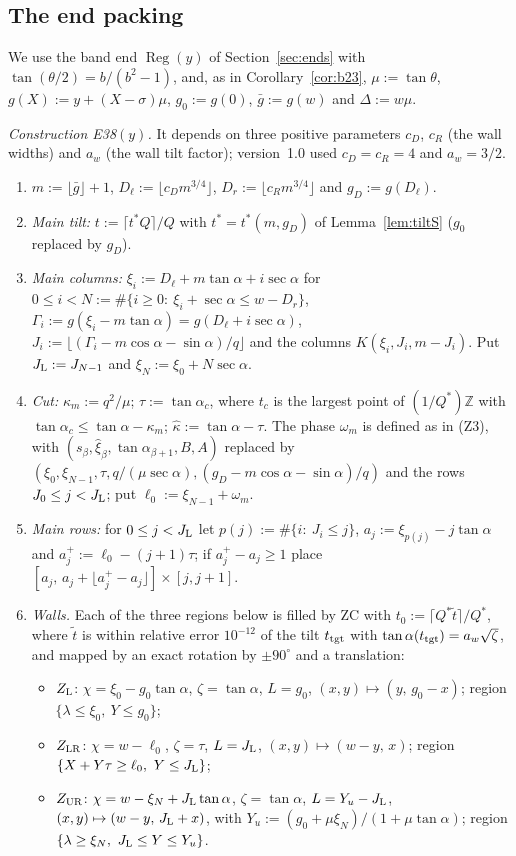 \documentclass[11pt]{amsart}
\newcommand{\Z}{\mathbb Z}
\newcommand{\Reg}{\operatorname{Reg}}
\newcommand{\ca}{\cos\alpha}
\newcommand{\sa}{\sin\alpha}
\newcommand{\ta}{\tan\alpha}
\newcommand{\se}{\sec\alpha}
\theoremstyle{definition}
\theoremstyle{remark}
\numberwithin{equation}{section}
\begin{document}
\subsection{The end packing}\label{ssec:E38}
We use the band end $\Reg(y)$ of Section~\ref{sec:ends} with $\tan(\theta/2)=b/(b^2-1)$, and, as in
Corollary~\ref{cor:b23}, $\mu:=\tan\theta$, $g(X):=y+(X-\sigma)\mu$, $g_0:=g(0)$, $\bar g:=g(w)$ and $\Delta:=w\mu$.

\emph{Construction E38$(y)$.} It depends on three positive parameters $c_D$, $c_R$ (the wall widths) and $a_w$ (the wall
tilt factor); version~1.0 used $c_D=c_R=4$ and $a_w=3/2$.
\begin{enumerate}[label=(E\arabic*)]
\item $m:=\lfloor\bar g\rfloor+1$, $D_\ell:=\lfloor c_Dm^{3/4}\rfloor$, $D_r:=\lfloor c_Rm^{3/4}\rfloor$ and $g_D:=g(D_\ell)$.
\item \emph{Main tilt:} $t:=\lceil t^*Q\rceil/Q$ with $t^*=t^*(m,g_D)$ of Lemma~\ref{lem:tiltS} ($g_0$ replaced by
$g_D$).
\item \emph{Main columns:} $\xi_i:=D_\ell+m\ta+i\se$ for $0\le i<N:=\#\{i\ge0:\ \xi_i+\se\le w-D_r\}$,
$\Gamma_i:=g(\xi_i-m\ta)=g(D_\ell+i\se)$, $J_i:=\lfloor(\Gamma_i-m\ca-\sa)/q\rfloor$ and the columns
$K(\xi_i,J_i,m-J_i)$. Put $J_{\rm L}:=J_{N-1}$ and $\xi_N:=\xi_0+N\se$.
\item \emph{Cut:} $\kappa_m:=q^2/\mu$; $\tau:=\tan\alpha_c$, where $t_c$ is the largest point of $(1/Q^*)\Z$ with
$\tan\alpha_c\le\ta-\kappa_m$; $\hat\kappa:=\ta-\tau$. The phase $\omega_m$ is defined as in (Z3), with
$(s_\beta,\hat\xi_\beta,\tan\alpha_{\beta+1},B,A)$ replaced by $(\xi_0,\xi_{N-1},\tau,q/(\mu\se),(g_D-m\ca-\sa)/q)$ and
the rows $J_0\le j<J_{\rm L}$; put $\ell_0:=\xi_{N-1}+\omega_m$.
\item \emph{Main rows:} for $0\le j<J_{\rm L}$ let $p(j):=\#\{i:\ J_i\le j\}$, $a_j:=\xi_{p(j)}-j\ta$ and
$a_j^+:=\ell_0-(j+1)\tau$; if $a_j^+-a_j\ge1$ place $[a_j,\,a_j+\lfloor a_j^+-a_j\rfloor]\times[j,j+1]$.
\item \emph{Walls.} Each of the three regions below is filled by ZC with $t_0:=\lceil Q^*\tilde t\rceil/Q^*$, where
$\tilde t$ is within relative error $10^{-12}$ of the tilt $t_{\rm tgt}$ with $\tan\alpha(t_{\rm tgt})=a_w\sqrt\zeta$, and
mapped by an exact rotation by $\pm90^\circ$ and a translation:
\begin{itemize}
\item $Z_{\rm L}$: $\chi=\xi_0-g_0\ta$, $\zeta=\ta$, $L=g_0$, $(x,y)\mapsto(y,\,g_0-x)$; region
$\{\lambda\le\xi_0,\ Y\le g_0\}$;
\item $Z_{\rm LR}$: $\chi=w-\ell_0$, $\zeta=\tau$, $L=J_{\rm L}$, $(x,y)\mapsto(w-y,\,x)$; region
$\{X+Y\tau\ge\ell_0,\ Y\le J_{\rm L}\}$;
\item $Z_{\rm UR}$: $\chi=w-\xi_N+J_{\rm L}\ta$, $\zeta=\ta$, $L=Y_u-J_{\rm L}$, $(x,y)\mapsto(w-y,\,J_{\rm L}+x)$, with
$Y_u:=(g_0+\mu\xi_N)/(1+\mu\ta)$; region $\{\lambda\ge\xi_N,\ J_{\rm L}\le Y\le Y_u\}$.
\end{itemize}
\end{enumerate}
\end{document}
